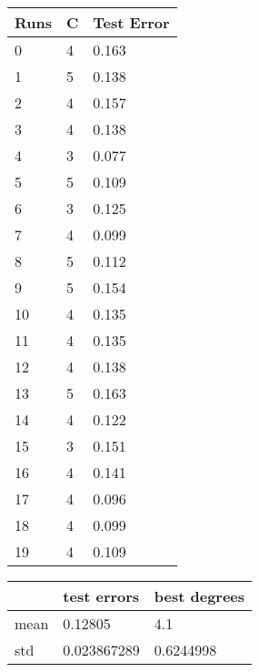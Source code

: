 \documentclass[
]{article}
\author{}
\date{}
\begin{document}
\begin{longtable}[]{@{}lll@{}}
\toprule
Runs & C & Test Error\tabularnewline
\midrule
\endhead
0 & 4 & 0.163\tabularnewline
1 & 5 & 0.138\tabularnewline
2 & 4 & 0.157\tabularnewline
3 & 4 & 0.138\tabularnewline
4 & 3 & 0.077\tabularnewline
5 & 5 & 0.109\tabularnewline
6 & 3 & 0.125\tabularnewline
7 & 4 & 0.099\tabularnewline
8 & 5 & 0.112\tabularnewline
9 & 5 & 0.154\tabularnewline
10 & 4 & 0.135\tabularnewline
11 & 4 & 0.135\tabularnewline
12 & 4 & 0.138\tabularnewline
13 & 5 & 0.163\tabularnewline
14 & 4 & 0.122\tabularnewline
15 & 3 & 0.151\tabularnewline
16 & 4 & 0.141\tabularnewline
17 & 4 & 0.096\tabularnewline
18 & 4 & 0.099\tabularnewline
19 & 4 & 0.109\tabularnewline
\bottomrule
\end{longtable}

\begin{longtable}[]{@{}lll@{}}
\toprule
& test errors & best degrees\tabularnewline
\midrule
\endhead
mean & 0.12805 & 4.1\tabularnewline
std & 0.023867289 & 0.6244998\tabularnewline
\bottomrule
\end{longtable}
\end{document}
